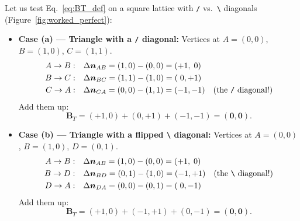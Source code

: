 \documentclass[11pt,a4paper]{article}
\newcommand{\code}[1]{\texttt{#1}}
\begin{document}
Let us test Eq.~\eqref{eq:BT_def} on a square lattice with \code{/} vs.\ \code{\textbackslash}
diagonals (Figure~\ref{fig:worked_perfect}):
\begin{itemize}
  \item \textbf{Case (a) --- Triangle with a \code{/} diagonal:}
        Vertices at $A=(0,0)$, $B=(1,0)$, $C=(1,1)$.
        \begin{align*}
          A \to B: &\quad \Delta\bm{n}_{AB} = (1,0) - (0,0) = (+1,\; 0) \\
          B \to C: &\quad \Delta\bm{n}_{BC} = (1,1) - (1,0) = (\;0, +1) \\
          C \to A: &\quad \Delta\bm{n}_{CA} = (0,0) - (1,1) = (-1, -1) \quad\text{(the \code{/} diagonal!)}
        \end{align*}
        Add them up:
        \[
          \bm{B}_T = (+1, 0) + (0, +1) + (-1, -1) = \bm{(0, 0)}.
        \]
  \item \textbf{Case (b) --- Triangle with a flipped \code{\textbackslash} diagonal:}
        Vertices at $A=(0,0)$, $B=(1,0)$, $D=(0,1)$.
        \begin{align*}
          A \to B: &\quad \Delta\bm{n}_{AB} = (1,0) - (0,0) = (+1,\; 0) \\
          B \to D: &\quad \Delta\bm{n}_{BD} = (0,1) - (1,0) = (-1, +1) \quad\text{(the \code{\textbackslash} diagonal!)} \\
          D \to A: &\quad \Delta\bm{n}_{DA} = (0,0) - (0,1) = (\;0, -1)
        \end{align*}
        Add them up:
        \[
          \bm{B}_T = (+1, 0) + (-1, +1) + (0, -1) = \bm{(0, 0)}.
        \]
\end{itemize}
\end{document}
